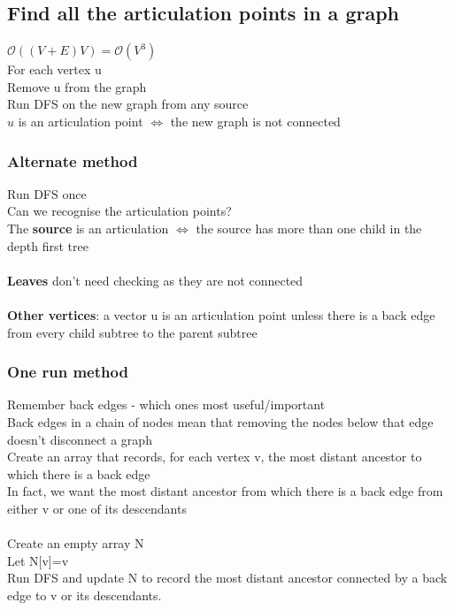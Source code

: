 \documentclass{article}[18pt]
\begin{document}
\subsection{Find all the articulation points in a graph}
$\mathcal{O}((V+E)V)=\mathcal{O}(V^3)$\\
For each vertex u\\
Remove u from the graph\\
Run DFS on the new graph from any source\\
$u$ is an articulation point $\Leftrightarrow$ the new graph is not connected
\subsubsection{Alternate method}
Run DFS once\\
Can we recognise the articulation points?\\
The \textbf{source} is an articulation $\Leftrightarrow$ the source has more than one child in the depth first tree\\
\\
\textbf{Leaves} don't need checking as they are not connected\\
\\
\textbf{Other vertices}: a vector u is an articulation point unless there is a back edge from every child subtree to the parent subtree
\subsubsection{One run method}
Remember back edges - which ones most useful/important\\
Back edges in a chain of nodes mean that removing the nodes below that edge doesn't disconnect a graph\\
Create an array that records, for each vertex v, the most distant ancestor to which there is a back edge\\
In fact, we want the most distant ancestor from which there is a back edge from either v or one of its descendants\\
\\
Create an empty array N\\
Let N[v]=v\\
Run DFS and update N to record the most distant ancestor connected by a back edge to v or its descendants.
\end{document}
